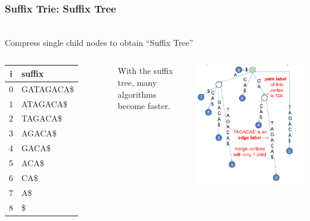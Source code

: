 \documentclass{beamer}
\begin{document}
\begin{frame}
  \frametitle{Suffix Trie: Suffix Tree}
  {\smaller
  \begin{center}
    \\
    Compress single child nodes to obtain ``Suffix Tree''
  \end{center}
  \begin{columns}[T]

    \begin{tabular}{c|l}
      i & suffix\\
      \hline
      0 & GATAGACA\$\\
      1 & ATAGACA\$\\
      2 & TAGACA\$\\
      3 & AGACA\$\\
      4 & GACA\$\\
      5 & ACA\$\\
      6 & CA\$\\
      7 & A\$\\
      8 & \$\\
    \end{tabular}

    \bigskip

    With the suffix tree, many algorithms become faster.


    \includegraphics[width=.9\textwidth]{../img/suffixtree_halim}
  \end{columns}
  }
\end{frame}
\end{document}
